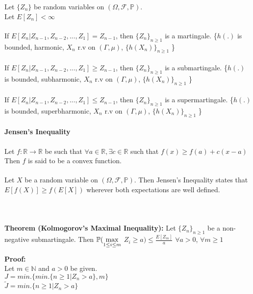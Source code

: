 \documentclass[main]{subfiles}
\begin{document}
    Let $\{Z_{n}\}$ be random variables on $(\Omega,\mathcal{F},\mathbb{P})$.\\
    Let $E[Z_{n}] < \infty$
    \\
    \\If $E[Z_{n}| Z_{n-1}, Z_{n-2},..., Z_{1}]=Z_{n-1}$, then $\{Z_{n}\}_{n \geq 1}$ is a martingale. \{$h(.)$ is bounded, harmonic, $X_{n}$ r.v on $(\Gamma, \mu)$, $\{h(X_{n})\}_{n \geq 1}$ \}
    \\
    \\If $E[Z_{n}| Z_{n-1}, Z_{n-2},..., Z_{1}] \geq Z_{n-1}$, then $\{Z_{n}\}_{n \geq 1}$ is a submartingale. \{$h(.)$ is bounded, subharmonic, $X_{n}$ r.v on $(\Gamma, \mu)$, $\{h(X_{n})\}_{n \geq 1}$ \}
    \\
    \\If $E[Z_{n}| Z_{n-1}, Z_{n-2},..., Z_{1}] \leq Z_{n-1}$, then $\{Z_{n}\}_{n \geq 1}$ is a supermartingale. \{$h(.)$ is bounded, superbharmonic, $X_{n}$ r.v on $(\Gamma, \mu)$, $\{h(X_{n})\}_{n \geq 1}$ \}
    \\
    \\
    \noindent \textbf{Jensen's Inequality}
    \\
    \\ Let $f:  \mathbb{R} \to \mathbb{R}$ be such that $\forall a \in \mathbb{R}, \exists c \in \mathbb{R}$ such that $f(x) \geq f(a) + c(x-a)$
    \\Then $f$ is said to be a convex function.
    \\
    \\Let $X$ be a random variable on $(\Omega,\mathcal{F},\mathbb{P})$. Then Jensen's Inequality states that $E[f(X)] \geq f(E[X])$ wherever both expectations are well defined.
    \\
    \\
    \\
    \\
    \noindent \textbf{Theorem (Kolmogorov's Maximal Inequality): }Let $\{Z_{n}\}_{n \geq 1}$ be a non-negative submartingale. Then $\mathbb{P} (\smash{\displaystyle\max_{1 \leq i \leq m}}$ \space $Z_{i} \geq a) \leq \frac{E[Z_{m}]}{a}$ \space $\forall a > 0$, $\forall m \geq 1$
    \\
    \\
    \noindent \textbf{Proof:}
    \\Let $m \in \mathbb{N}$ and $a > 0$ be given.
    \\$J=min.\{min.\{n \geq 1 | Z_{n} > a\}, m\}$
\\$\tilde{J} = min.\{n \geq 1 | Z_{n} > a\}$
\end{document}
